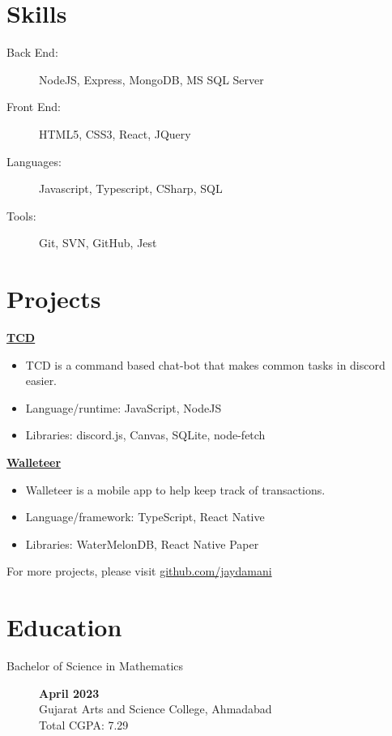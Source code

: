 \documentclass[a4paper,10pt]{article}
\begin{document}
\section{Skills}

\begin{description}
    \item[Back End:] NodeJS, Express, MongoDB, MS SQL Server
    \item[Front End:] HTML5, CSS3, React, JQuery
    \item[Languages:] Javascript, Typescript, CSharp, SQL
    \item[Tools:] Git, SVN, GitHub, Jest
\end{description}

\section{Projects}
\setlength\parindent{0pt}

\href{https://github.com/jaydamani/TCD}{\textbf{TCD}}
\begin{itemize}
    \item TCD is a command based chat-bot that makes common tasks in discord easier.
    \item Language/runtime: JavaScript, NodeJS
    \item Libraries: discord.js, Canvas, SQLite, node-fetch
\end{itemize}

\href{https://github.com/jaydamani/walleteer}{\textbf{Walleteer}}
\begin{itemize}
    \item Walleteer is a mobile app to help keep track of transactions.
    \item Language/framework: TypeScript, React Native
    \item Libraries: WaterMelonDB, React Native Paper
\end{itemize}

For more projects, please visit \href{https://github.com/jaydamani}{github.com/jaydamani}

\section{Education}

\begin{description}
    \item[Bachelor of Science in Mathematics ] \hfill  \textbf{April 2023} \\
        Gujarat Arts and Science College, Ahmadabad
        \\ Total CGPA\@: 7.29
\end{description}
\end{document}
